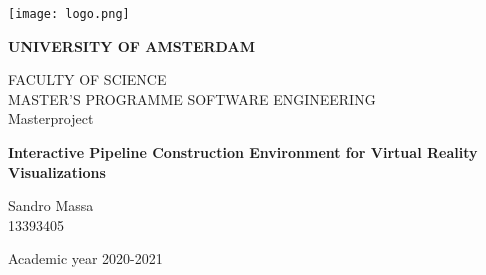 \thispagestyle{empty}
\begin{titlepage}
  \begin{center}
    \texttt{[image: logo.png]}
  \end{center}
  \bfseries{
    \begin{center}
      \large
     \textbf{UNIVERSITY OF AMSTERDAM}\\
      \normalsize
      
      \vspace*{.5truecm}
      FACULTY OF SCIENCE\\
      \vspace*{.5truecm}
      MASTER'S PROGRAMME SOFTWARE ENGINEERING\\
      \vspace*{2truecm} \large
      Masterproject

     
        
      \LARGE
      \textbf{{Interactive Pipeline Construction Environment for Virtual Reality Visualizations}}\\



    \end{center}
    \vspace*{2.5truecm} \large
    \begin{flushleft}


      Sandro Massa\\
      13393405\\

    \end{flushleft}
    \vspace*{0.7truecm}
    \begin{center}
      Academic year 2020-2021
    \end{center} \clearpage
  }
\end{titlepage}